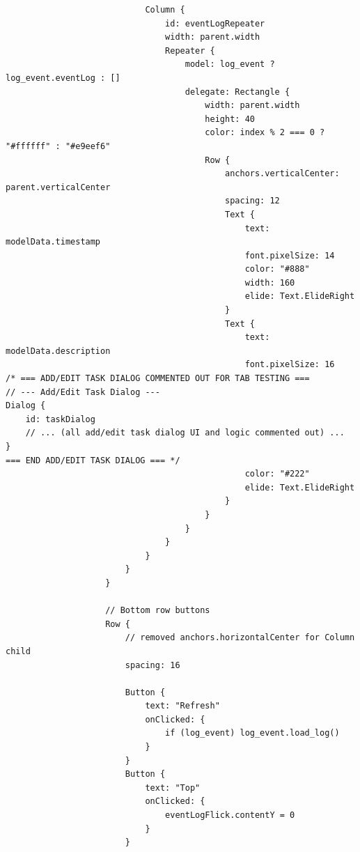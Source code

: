 \documentclass{report}
\begin{document}
\begin{lstlisting}
                            Column {
                                id: eventLogRepeater
                                width: parent.width
                                Repeater {
                                    model: log_event ? log_event.eventLog : []
                                    delegate: Rectangle {
                                        width: parent.width
                                        height: 40
                                        color: index % 2 === 0 ? "#ffffff" : "#e9eef6"
                                        Row {
                                            anchors.verticalCenter: parent.verticalCenter
                                            spacing: 12
                                            Text {
                                                text: modelData.timestamp
                                                font.pixelSize: 14
                                                color: "#888"
                                                width: 160
                                                elide: Text.ElideRight
                                            }
                                            Text {
                                                text: modelData.description
                                                font.pixelSize: 16
/* === ADD/EDIT TASK DIALOG COMMENTED OUT FOR TAB TESTING ===
// --- Add/Edit Task Dialog ---
Dialog {
    id: taskDialog
    // ... (all add/edit task dialog UI and logic commented out) ...
}
=== END ADD/EDIT TASK DIALOG === */
                                                color: "#222"
                                                elide: Text.ElideRight
                                            }
                                        }
                                    }
                                }
                            }
                        }
                    }

                    // Bottom row buttons
                    Row {
                        // removed anchors.horizontalCenter for Column child
                        spacing: 16

                        Button {
                            text: "Refresh"
                            onClicked: {
                                if (log_event) log_event.load_log()
                            }
                        }
                        Button {
                            text: "Top"
                            onClicked: {
                                eventLogFlick.contentY = 0
                            }
                        }
                    

\end{lstlisting}
\end{document}
